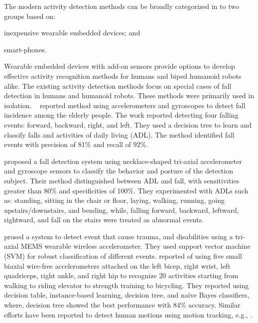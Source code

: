 \documentclass[letterpaper]{article}
\begin{document}
\begin{sloppy}
The modern activity detection methods can be broadly categorized in to two groups based on: 
\begin{inparaenum}[1)] \item inexpensive wearable embedded devices; and \item smart-phones. 
\end{inparaenum} Wearable embedded devices with add-on sensors provide options to develop effective 
activity recognition methods for humans and biped humanoid robots alike. The existing activity 
detection methods focus on special cases of fall detection in humans and humanoid robots. These 
methods were primarily used in isolation.  {~\cite{ojetola2011fall}} reported method using 
accelerometers and gyroscopes to detect fall incidence among the elderly people. The work reported 
detecting four falling events: forward, backward, right, and left.  They used a decision tree to 
learn and classify falls and activities of daily living (ADL). The method identified fall events 
with precision of 81\%  and recall of 92\%. 

\cite{baek2013real} proposed  a fall  detection  system  using necklace-shaped tri-axial
accelerometer  and  gyroscope  sensors  to  classify  the  behavior  and  posture  of  the detection
 subject. Their method distinguished between  ADL and  fall, with  sensitivities  greater  than 
 80\%  and specificities  of  100\%. They experimented with ADLs such as: standing, sitting in the 
 chair or floor, laying, walking, running, going upstairs/downstairs, and bending, while, 
 falling forward, backward, leftward, rightward, and fall on the stairs were treated as abnormal 
 events. 
 
\cite{leone2013supervised} prosed a system to detect event that cause trauma, and disabilities
using a tri-axial MEMS wearable wireless accelerometer. They used support vector machine (SVM) for
robust classification of different events. \cite{Bao04activityrecognition} reported of using five 
small biaxial wire-free accelerometers attached  on the left bicep, right wrist, left quadriceps, 
right ankle, and right hip to recognize 20 activities starting from  walking  to  riding elevator  
to  strength  training to bicycling. They reported using decision table, instance-based learning, 
decision tree, and na\"{i}ve Bayes classifiers, where, decision tree showed the best performance 
with 84\% accuracy.  Similar efforts have been reported to detect human motions using motion 
tracking, e.g., 
\cite{dumitrache2013fall,kumarwearable,krishnan2014activity,gao2014evaluation,alvarez2015evaluating}.
 



\end{sloppy}
\end{document}
